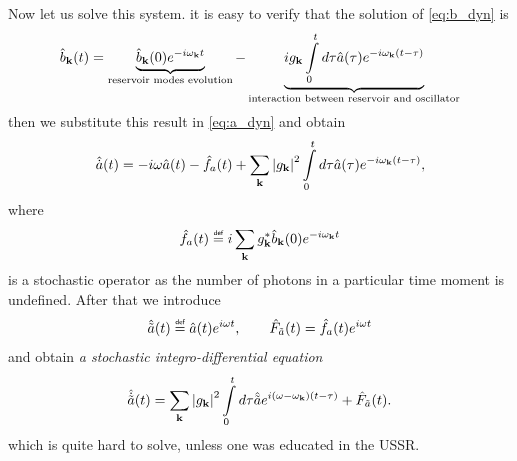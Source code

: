 Now let us solve this system. it is easy to verify that the solution of  \eqref{eq:b_dyn}  is
\begin{equation}
	\hat{b}_{\mathbf{k}}(t) = \underbrace{\hat{b}_{\mathbf{k}}(0) e^{-i\omega_{\mathbf{k}} t}}_{\text{reservoir modes evolution}} - \underbrace{i g_{\mathbf{k}} \int \limits_0^{t} d\tau \hat{a}(\tau) e^{-i\omega_{\mathbf{k}}(t - \tau)}}_{\text{interaction between reservoir and oscillator}}
\end{equation}
then we substitute this result in \eqref{eq:a_dyn} and obtain
\begin{equation}
	\hat{\dot{a}}(t) = - i \omega \hat{a}(t) - \hat{f}_a(t) + \sum_{\mathbf{k}} \left| g_{\mathbf{k}} \right|^2 \int \limits_0^td\tau \hat{a}(\tau) e^{-i\omega_{\mathbf{k}}(t - \tau)},
\end{equation}
where
\begin{equation}
	\hat{f}_a(t) \myeq i \sum_{\kv} g_{\kv}^* \hat{b}_{\kv}(0) e^{-i\omega_{\kv} t}
\end{equation}
is a stochastic operator as the number of photons in a particular time moment is undefined. After that we introduce
\begin{equation}
	\hat{\tilde{a}}(t) \myeq \hat{a}(t) e^{i \omega t}, \qquad \hat{F}_{\tilde{a}} (t) = \hat{f}_a(t) e^{i \omega t}
\end{equation}
and obtain \textit{a stochastic integro-differential equation}
\begin{equation}
	\hat{\dot{\tilde{a}}}(t) = \sum_{\mathbf{k}} \left| g_{\mathbf{k}} \right|^2 \int \limits_0^t d\tau \hat{\tilde{a}} e^{i(\omega-\omega_{\mathbf{k}})(t - \tau)} + \hat{F}_{\tilde{a}} (t).
	\label{eq:st_int_dif}
\end{equation}
which is quite hard to solve, unless one was educated in the USSR.

